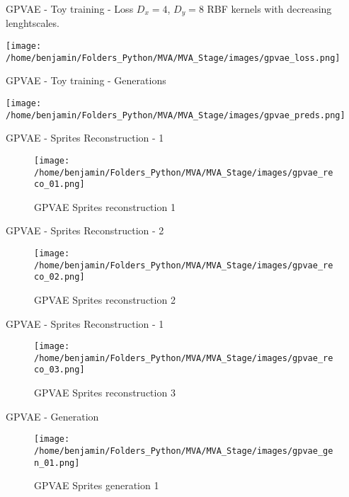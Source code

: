\begin{frame}{GPVAE - Toy training - Loss}
    $D_x = 4$, $D_y=8$ RBF kernels with decreasing lenghtscales.
    \begin{center}
    \texttt{[image: /home/benjamin/Folders\_Python/MVA/MVA\_Stage/images/gpvae\_loss.png]}
    \end{center}
\end{frame}

\begin{frame}{GPVAE - Toy training - Generations}
    \begin{center}
    \texttt{[image: /home/benjamin/Folders\_Python/MVA/MVA\_Stage/images/gpvae\_preds.png]}
    \end{center}
\end{frame}

\begin{frame}{GPVAE - Sprites Reconstruction - 1}
    \begin{figure}[H]
    \centering
    \texttt{[image: /home/benjamin/Folders\_Python/MVA/MVA\_Stage/images/gpvae\_reco\_01.png]}
    \caption{GPVAE Sprites reconstruction 1}
    \label{fig:GPVAE Sprites reconstruction 1}
\end{figure}
\end{frame}

\begin{frame}{GPVAE - Sprites Reconstruction - 2}
\begin{figure}[H]
    \centering
    \texttt{[image: /home/benjamin/Folders\_Python/MVA/MVA\_Stage/images/gpvae\_reco\_02.png]}
    \caption{GPVAE Sprites reconstruction 2}
    \label{fig:GPVAE Sprites reconstruction 2}
\end{figure}
\end{frame}

\begin{frame}{GPVAE - Sprites Reconstruction - 1}
\begin{figure}[H]
    \centering
    \texttt{[image: /home/benjamin/Folders\_Python/MVA/MVA\_Stage/images/gpvae\_reco\_03.png]}
    \caption{GPVAE Sprites reconstruction 3}
    \label{fig:GPVAE Sprites reconstruction 3}
\end{figure}
\end{frame}

\begin{frame}{GPVAE - Generation}
    \begin{figure}[H]
        \centering
        \texttt{[image: /home/benjamin/Folders\_Python/MVA/MVA\_Stage/images/gpvae\_gen\_01.png]}
        \caption{GPVAE Sprites generation 1}
        \label{fig:GPVAE Sprites generation 1}
    \end{figure}
\end{frame}
